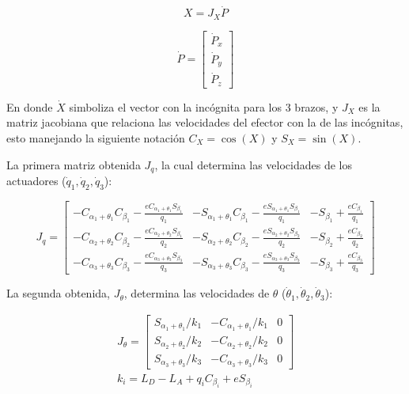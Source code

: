 \begin{equation}
    X = J_{X} \dot{P}
    \label{Eq:JacobianExample}
\end{equation}

\begin{equation}
    \dot{P} = \left[\begin{array}{c} \dot{P}_x \\ \dot{P}_y \\ \dot{P}_z \end{array} \right]
    \label{Eq:dP}
\end{equation}

En donde $ \dot{X} $ simboliza el vector con la incógnita para los 3 brazos, y $J_{X}$ es la matriz jacobiana que relaciona las velocidades del efector con la de las incógnitas, esto manejando la siguiente notación $C_X = \cos{\left( X \right)}$ y $S_X = \sin{\left( X \right)}$.

La primera matriz obtenida $J_{q}$, la cual determina las velocidades de los actuadores ($\dot{q}_{1}, \dot{q}_{2}, \dot{q}_{3}$): 

\begin{equation}
    J_{q} = \left[ \begin{array}{ccc}
        -C_{\alpha_1+\theta_1}C_{\beta_1} - \frac{eC_{\alpha_1+\theta_1}S_{\beta_1}}{q_1} & -S_{\alpha_1+\theta_1}C_{\beta_1} - \frac{eS_{\alpha_1+\theta_1}S_{\beta_1}}{q_1} & -S_{\beta_1} + \frac{eC_{\beta_1}}{q_1} \\
        -C_{\alpha_2+\theta_2}C_{\beta_2} - \frac{eC_{\alpha_2+\theta_2}S_{\beta_1}}{q_2} & -S_{\alpha_2+\theta_2}C_{\beta_2} - \frac{eS_{\alpha_2+\theta_2}S_{\beta_2}}{q_2} & -S_{\beta_2} + \frac{eC_{\beta_2}}{q_2} \\
        -C_{\alpha_3+\theta_3}C_{\beta_3} - \frac{eC_{\alpha_3+\theta_3}S_{\beta_3}}{q_3} & -S_{\alpha_3+\theta_3}C_{\beta_3} - \frac{eS_{\alpha_3+\theta_3}S_{\beta_3}}{q_3} & -S_{\beta_3} + \frac{eC_{\beta_3}}{q_3}
    \end{array} \right]
\end{equation}

La segunda obtenida, $J_{\theta}$, determina las velocidades de $\theta$ ($\dot{\theta}_{1}, \dot{\theta}_{2}, \dot{\theta}_{3}$): 

\begin{subequations}
    \begin{eqnarray}
        J_{\theta} = \left[ \begin{array}{ccc}
            S_{\alpha_1 + \theta_1}/k_1 & -C_{\alpha_1 + \theta_1}/k_1 & 0 \\
            S_{\alpha_2 + \theta_2}/k_2 & -C_{\alpha_2 + \theta_2}/k_2 & 0 \\
            S_{\alpha_3 + \theta_3}/k_3 & -C_{\alpha_3 + \theta_3}/k_3 & 0
        \end{array} \right] \\
        k_i = L_D - L_A + q_i C_{\beta_i} + eS_{\beta_i}
    \end{eqnarray}
\end{subequations}

